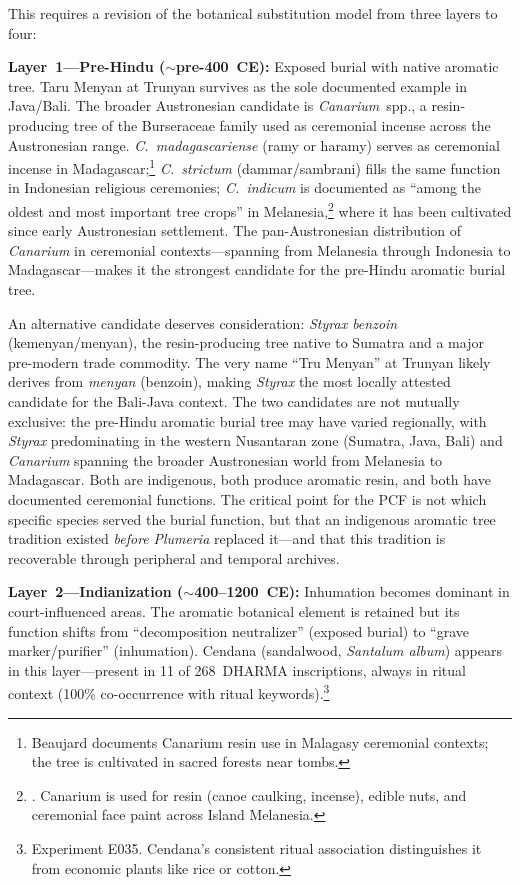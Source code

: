 \documentclass[12pt,a4paper]{article}
\begin{document}
This requires a revision of the botanical substitution model from three layers to four:

\textbf{Layer~1---Pre-Hindu ($\sim$pre-400~CE):} Exposed burial with native aromatic tree. Taru Menyan at Trunyan survives as the sole documented example in Java/Bali. The broader Austronesian candidate is \textit{Canarium}~spp., a resin-producing tree of the Burseraceae family used as ceremonial incense across the Austronesian range. \textit{C.~madagascariense} (ramy or haramy) serves as ceremonial incense in Madagascar;\footnote{Beaujard documents Canarium resin use in Malagasy ceremonial contexts; the tree is cultivated in sacred forests near tombs.} \textit{C.~strictum} (dammar/sambrani) fills the same function in Indonesian religious ceremonies; \textit{C.~indicum} is documented as ``among the oldest and most important tree crops'' in Melanesia,\footnote{\autocite{yen1995canarium}. Canarium is used for resin (canoe caulking, incense), edible nuts, and ceremonial face paint across Island Melanesia.} where it has been cultivated since early Austronesian settlement. The pan-Austronesian distribution of \textit{Canarium} in ceremonial contexts---spanning from Melanesia through Indonesia to Madagascar---makes it the strongest candidate for the pre-Hindu aromatic burial tree.

An alternative candidate deserves consideration: \textit{Styrax benzoin} (kemenyan/menyan), the resin-producing tree native to Sumatra and a major pre-modern trade commodity. The very name ``Tru Menyan'' at Trunyan likely derives from \emph{menyan} (benzoin), making \textit{Styrax} the most locally attested candidate for the Bali-Java context. The two candidates are not mutually exclusive: the pre-Hindu aromatic burial tree may have varied regionally, with \textit{Styrax} predominating in the western Nusantaran zone (Sumatra, Java, Bali) and \textit{Canarium} spanning the broader Austronesian world from Melanesia to Madagascar. Both are indigenous, both produce aromatic resin, and both have documented ceremonial functions. The critical point for the PCF is not which specific species served the burial function, but that an indigenous aromatic tree tradition existed \emph{before} \textit{Plumeria} replaced it---and that this tradition is recoverable through peripheral and temporal archives.

\textbf{Layer~2---Indianization ($\sim$400--1200~CE):} Inhumation becomes dominant in court-influenced areas. The aromatic botanical element is retained but its function shifts from ``decomposition neutralizer'' (exposed burial) to ``grave marker/purifier'' (inhumation). Cendana (sandalwood, \textit{Santalum album}) appears in this layer---present in 11 of 268~DHARMA inscriptions, always in ritual context (100\% co-occurrence with ritual keywords).\footnote{Experiment E035. Cendana's consistent ritual association distinguishes it from economic plants like rice or cotton.}
\end{document}
